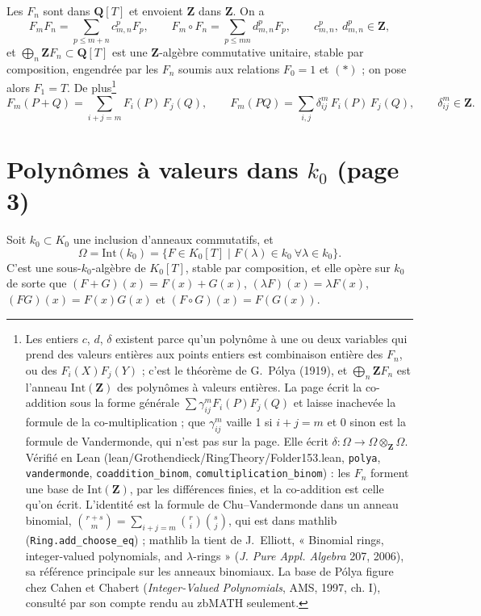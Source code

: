 \documentclass[11pt,a4paper]{article}
\begin{document}
Les $F_{n}$ sont dans $\mathbf{Q}[T]$ et envoient $\mathbf{Z}$ dans $\mathbf{Z}$.
On a
\[
F_{m} F_{n} = \sum_{p \leq m+n} c^{p}_{m,n} F_{p},
\qquad
F_{m} \circ F_{n} = \sum_{p \leq mn} d^{p}_{m,n} F_{p},
\qquad c^{p}_{m,n},\ d^{p}_{m,n} \in \mathbf{Z},
\]
et $\bigoplus_{n} \mathbf{Z} F_{n} \subset \mathbf{Q}[T]$ est une
$\mathbf{Z}$-algèbre commutative unitaire, stable par composition, engendrée
par les $F_{n}$ soumis aux relations $F_{0} = 1$ et $(\ast)$ ; on pose alors
$F_{1} = T$. De plus\footnote{Les entiers $c$, $d$, $\delta$ existent parce qu'un polynôme à une ou
deux variables qui prend des valeurs entières aux points entiers est
combinaison entière des $F_{n}$, ou des $F_{i}(X)F_{j}(Y)$ ; c'est le théorème de
G.~Pólya (1919), et $\bigoplus_{n} \mathbf{Z} F_{n}$ est l'anneau
$\mathrm{Int}(\mathbf{Z})$ des polynômes à valeurs entières. La page écrit la
co-addition sous la forme générale $\sum \gamma^{m}_{ij} F_{i}(P)F_{j}(Q)$ et
laisse inachevée la formule de la co-multiplication ; que $\gamma^{m}_{ij}$ vaille
1 si $i + j = m$ et 0 sinon est la formule de Vandermonde, qui n'est pas sur la
page. Elle écrit $\delta : \Omega \to \Omega \otimes_{\mathbf{Z}} \Omega$.
Vérifié en Lean (lean/Grothendieck/RingTheory/Folder153.lean, \texttt{polya},
\texttt{vandermonde}, \texttt{coaddition\_binom},
\texttt{comultiplication\_binom}) : les $F_n$ forment une base de
$\mathrm{Int}(\mathbf{Z})$, par les différences finies, et la co-addition
est celle qu'on écrit. L'identité est la formule de Chu--Vandermonde dans un
anneau binomial, $\binom{r+s}{m} = \sum_{i+j=m} \binom{r}{i}\binom{s}{j}$, qui
est dans mathlib (\texttt{Ring.add\_choose\_eq}) ; mathlib la tient de
J.~Elliott, « Binomial rings, integer-valued polynomials, and
$\lambda$-rings » (\emph{J. Pure Appl. Algebra} 207, 2006), sa référence
principale sur les anneaux binomiaux. La base de Pólya figure chez Cahen et
Chabert (\emph{Integer-Valued Polynomials}, AMS, 1997, ch. I), consulté par
son compte rendu au zbMATH seulement.}
\[
F_{m}(P + Q) = \sum_{i+j=m} F_{i}(P)\, F_{j}(Q),
\qquad
F_{m}(PQ) = \sum_{i,j} \delta^{m}_{ij}\, F_{i}(P)\, F_{j}(Q),
\qquad \delta^{m}_{ij} \in \mathbf{Z}.
\]

\section*{Polynômes à valeurs dans $k_{0}$ (page 3)}

Soit $k_{0} \subset K_{0}$ une inclusion d'anneaux commutatifs, et
\[
\Omega = \mathrm{Int}(k_{0}) = \{F \in K_{0}[T] \mid F(\lambda) \in k_{0}\
\forall \lambda \in k_{0}\}.
\]
C'est une sous-$k_{0}$-algèbre de $K_{0}[T]$, stable par composition, et elle
opère sur $k_{0}$ de sorte que $(F + G)(x) = F(x) + G(x)$, $(\lambda F)(x) =
\lambda F(x)$, $(FG)(x) = F(x)G(x)$ et $(F \circ G)(x) = F(G(x))$.
\end{document}
